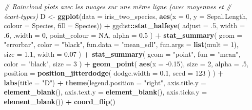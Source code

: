 \documentclass[
  french,
]{book}
\newenvironment{Shaded}{\begin{snugshade}}{\end{snugshade}}
\newcommand{\CommentTok}[1]{\textcolor[rgb]{0.56,0.35,0.01}{\textit{#1}}}
\newcommand{\DataTypeTok}[1]{\textcolor[rgb]{0.13,0.29,0.53}{#1}}
\newcommand{\DecValTok}[1]{\textcolor[rgb]{0.00,0.00,0.81}{#1}}
\newcommand{\FloatTok}[1]{\textcolor[rgb]{0.00,0.00,0.81}{#1}}
\newcommand{\KeywordTok}[1]{\textcolor[rgb]{0.13,0.29,0.53}{\textbf{#1}}}
\newcommand{\NormalTok}[1]{#1}
\newcommand{\OperatorTok}[1]{\textcolor[rgb]{0.81,0.36,0.00}{\textbf{#1}}}
\newcommand{\OtherTok}[1]{\textcolor[rgb]{0.56,0.35,0.01}{#1}}
\newcommand{\StringTok}[1]{\textcolor[rgb]{0.31,0.60,0.02}{#1}}
\begin{document}
\begin{Shaded}
\begin{Highlighting}[]
\CommentTok{# Raincloud plots avec les nuages sur une même ligne (avec moyennes et }
\CommentTok{# écart-types)}
\NormalTok{D <-}
\StringTok{  }\KeywordTok{ggplot}\NormalTok{(}\DataTypeTok{data =}\NormalTok{ iris_two_species, }
         \KeywordTok{aes}\NormalTok{(}\DataTypeTok{x =} \DecValTok{0}\NormalTok{, }\DataTypeTok{y =}\NormalTok{ Sepal.Length, }\DataTypeTok{colour =}\NormalTok{ Species, }\DataTypeTok{fill =}\NormalTok{ Species)) }\OperatorTok{+}
\StringTok{  }\NormalTok{ggdist}\OperatorTok{::}\KeywordTok{stat_halfeye}\NormalTok{(}
    \DataTypeTok{adjust =} \FloatTok{.5}\NormalTok{, }
    \DataTypeTok{width =} \FloatTok{.6}\NormalTok{, }
    \DataTypeTok{.width =} \DecValTok{0}\NormalTok{, }
    \DataTypeTok{point_colour =} \OtherTok{NA}\NormalTok{,}
    \DataTypeTok{alpha =} \FloatTok{0.5}
\NormalTok{    ) }\OperatorTok{+}
\StringTok{  }\KeywordTok{stat_summary}\NormalTok{(}
    \DataTypeTok{geom =} \StringTok{"errorbar"}\NormalTok{,}
    \DataTypeTok{color =} \StringTok{"black"}\NormalTok{,}
    \DataTypeTok{fun.data =} \StringTok{"mean_sdl"}\NormalTok{,}
    \DataTypeTok{fun.args =} \KeywordTok{list}\NormalTok{(}\DataTypeTok{mult =} \DecValTok{1}\NormalTok{),}
    \DataTypeTok{size =} \FloatTok{1.1}\NormalTok{, }
    \DataTypeTok{width =} \FloatTok{0.07}
\NormalTok{    ) }\OperatorTok{+}\StringTok{ }
\StringTok{  }\KeywordTok{stat_summary}\NormalTok{(}
    \DataTypeTok{geom =} \StringTok{"point"}\NormalTok{,}
    \DataTypeTok{fun =} \StringTok{"mean"}\NormalTok{, }
    \DataTypeTok{color =} \StringTok{"black"}\NormalTok{,}
    \DataTypeTok{size =} \DecValTok{3}
\NormalTok{    ) }\OperatorTok{+}
\StringTok{  }\KeywordTok{geom_point}\NormalTok{(}
    \KeywordTok{aes}\NormalTok{(}\DataTypeTok{x =} \FloatTok{-0.15}\NormalTok{),}
    \DataTypeTok{size =} \DecValTok{2}\NormalTok{, }
    \DataTypeTok{alpha =} \FloatTok{.5}\NormalTok{,}
    \DataTypeTok{position =} \KeywordTok{position_jitterdodge}\NormalTok{(}
                          \DataTypeTok{dodge.width =} \FloatTok{0.1}\NormalTok{,}
                          \DataTypeTok{seed =} \DecValTok{123}
\NormalTok{                    )}
\NormalTok{  ) }\OperatorTok{+}
\StringTok{  }\KeywordTok{labs}\NormalTok{(}\DataTypeTok{title =} \StringTok{"D"}\NormalTok{) }\OperatorTok{+}
\StringTok{  }\KeywordTok{theme}\NormalTok{(}\DataTypeTok{legend.position =} \StringTok{"right"}\NormalTok{,}
        \DataTypeTok{axis.title.y =} \KeywordTok{element_blank}\NormalTok{(),}
        \DataTypeTok{axis.text.y =} \KeywordTok{element_blank}\NormalTok{(),}
        \DataTypeTok{axis.ticks.y =} \KeywordTok{element_blank}\NormalTok{()) }\OperatorTok{+}
\StringTok{  }\KeywordTok{coord_flip}\NormalTok{() }
\end{Highlighting}
\end{Shaded}
\end{document}
